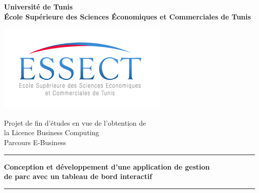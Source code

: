 

\thispagestyle{empty}


\begin{center}
    \textbf{Université de Tunis} \\

    \textbf{École Supérieure des Sciences Économiques et Commerciales de Tunis}

    \vspace{0.9cm}
    \includegraphics[width=0.3 \columnwidth]{chap1.images/essec.png}
    \vspace{0.9cm}

    Projet de fin d'études en vue de l'obtention de \\la Licence Business Computing \\ Parcours E-Business


    \vspace{1.5cm}

    \begingroup
    \color{isiBlue}
    \hrule height 1.3pt
    \endgroup
    \vspace{0.2cm}
    \begin{center}
        \textbf{\Large {Conception et développement d’une application de gestion\\ de parc avec un tableau de bord interactif}}
    \end{center}

    \vspace{0.3cm}

    \begingroup
    \color{isiBlue}
    \hrule height 1.3pt
    \endgroup
    \par
    \vspace{1.5cm}



\end{center}
